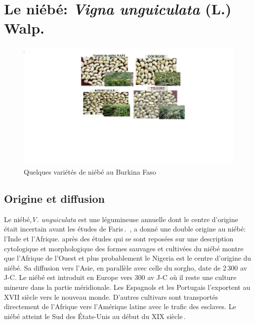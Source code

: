 \documentclass[a4paper,11pt]{article}
\begin{document}
\section{Le niébé: \emph{Vigna unguiculata} (L.) Walp.}
\begin{figure}%
  \begin{center}
   \includegraphics[width=12cm]{images/graines_niebe}
  \end{center}
\caption{Quelques variétés de niébé au Burkina Faso}
\end{figure}

\newpage



\subsection{Origine et diffusion}

Le niébé,\emph{V. unguiculata} est une légumineuse annuelle dont le
centre d’origine était incertain avant les études de
Faris\,\cite{FARIS_1963,FARIS_1965}. \citeauthor{Piper_1913}\,\citeyear{Piper_1913},
a donné une double origine au niébé: l’Inde et
l’Afrique.\cite{FARIS_1963,FARIS_1965} après des études qui
se sont reposées sur une description cytologique et morphologique des
formes sauvages et cultivées du niébé montre que l’Afrique de l’Ouest
et plus probablement le Nigeria est le centre d’origine du niébé. Sa
diffusion vers l’Asie, en parallèle avec celle du sorgho, date de
2\,300 av J-C. Le niébé est introduit en Europe vers 300 av J-C où il
reste une culture mineure dans la partie méridionale. Les Espagnols et
les Portugais l’exportent au XVII\ieme{} siècle vers le nouveau
monde. D’autres cultivars sont transportés directement de l’Afrique
vers l’Amérique latine avec le trafic des esclaves. Le niébé atteint
le Sud des États-Unis au début du XIX\ieme{}
siècle\,\cite{Sawadogo_2009}.
\end{document}
